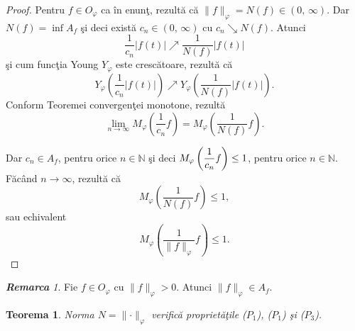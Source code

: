 \documentclass[ a4paper, 12pt]{report}
\newtheorem{theorem}{\bf Teorema}[section]
\theoremstyle{definition}
\theoremstyle{remark}
\newtheorem{remarc}{\bf Remarca}[section]
\numberwithin{equation}{section}
\begin{document}
\begin{proof} Pentru $f \in O_\varphi$ ca \^ in enun\c t, rezult\u a c\u a $\lVert f\rVert_\varphi = N(f) \in (0,\, \infty)$. Dar $N(f) = \inf A_f$ \c si deci exist\u a $c_n \in (0,\, \infty)$
cu $c_n \searrow N(f)$.
Atunci
$$\frac{1}{c_n}\lvert f(t) \rvert \nearrow \frac{1}{N(f)} \lvert f(t) \rvert$$ \c si cum func\c tia Young $Y_\varphi$ este cresc\u atoare, rezult\u a c\u a
$$Y_\varphi \left(\frac{1}{c_n}\lvert f(t) \rvert \right ) \nearrow Y_\varphi \left (\frac{1}{N(f)} \lvert f(t)\rvert \right).$$
Conform Teoremei convergen\c tei monotone, rezult\u a
$$\lim\limits_{n \to \infty}M_\varphi\left (\frac{1}{c_n}f\right ) =  M_\varphi\left (\frac{1}{N(f)}f\right ).$$

Dar $c_n \in A_f$, pentru orice $n \in \mathbb{N}$ \c si deci $M_\varphi\left(\displaystyle\frac{1}{c_n}f\right ) \leq 1$, pentru orice $n \in \mathbb{N}$. F\u ac\^ and $n \to \infty$, rezult\u a c\u a  $$M_\varphi\left (\frac{1}{N(f)}f\right) \leq 1,$$ sau echivalent
$$M_\varphi\left(\frac{1}{\lVert f\rVert_\varphi}f\right)  \leq 1.$$
\end{proof}

\begin{remarc}
Fie $f \in O_\varphi$ cu $\lVert f \rVert_\varphi >0$. Atunci $\lVert f \rVert _\varphi \in A_f$.
\end{remarc}

\begin{theorem}
Norma $N = \lVert \cdot \rVert_\varphi$ verific\u a propriet\u a\c tile ($P_1$), ($P_1$) \c si ($P_3$).
\end{theorem}
\end{document}
